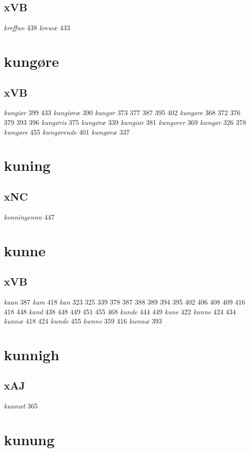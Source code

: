 \documentclass[a4paper,twocolumn]{article}
\begin{document}
\subsection{xVB}
\label{sec:org75d3e2a}
\emph{kreffwe} 438 \emph{krewæ} 433 
\section{kungøre}
\label{sec:org0b21853}
\subsection{xVB}
\label{sec:org491ae85}
\emph{kungiør} 399 433 \emph{kungiøræ} 390 \emph{kungør} 373 377 387 395 402 \emph{kungøre} 368 372 376 379 393 396 \emph{kungøris} 375 \emph{kungøræ} 339 \emph{kwngiør} 381 \emph{kwngorer} 369 \emph{kwngør} 326 378 \emph{kwngøre} 455 \emph{kwngørende} 401 \emph{kwngøræ} 337 
\section{kuning}
\label{sec:org64944f5}
\subsection{xNC}
\label{sec:org063f794}
\emph{konningennn} 447 
\section{kunne}
\label{sec:orgefa2fa3}
\subsection{xVB}
\label{sec:org721fddf}
\emph{kaan} 387 \emph{kam} 418 \emph{kan} 323 325 339 378 387 388 389 394 395 402 406 408 409 416 418 448 \emph{kand} 438 448 449 451 455 468 \emph{kunde} 444 449 \emph{kune} 422 \emph{kunne} 424 434 \emph{kunnæ} 418 424 \emph{kwnde} 455 \emph{kwnne} 359 416 \emph{kwnnæ} 393 
\section{kunnigh}
\label{sec:org99ca714}
\subsection{xAJ}
\label{sec:orga069a93}
\emph{kunnwt} 365 
\section{kunung}
\label{sec:org7d2006d}
\end{document}

